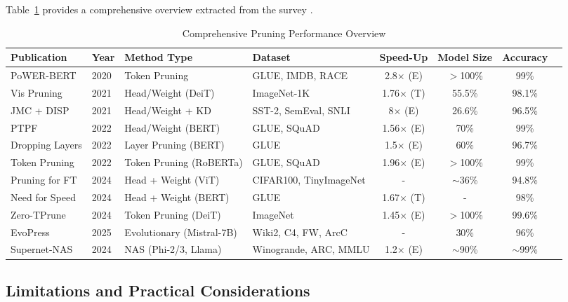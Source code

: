 Table~\ref{tab:comprehensive_pruning} provides a comprehensive overview extracted from the survey \cite{fernando2025}.

\begin{table}[H]
	\begin{adjustwidth}{-2cm}{0cm} 
		\centering
		\tiny
		\caption{Comprehensive Pruning Performance Overview}
		\label{tab:comprehensive_pruning}
		\begin{tabular}{@{}lllp{4.5cm}cccc@{}}
			\toprule
			\textbf{Publication} & \textbf{Year} & \textbf{Method Type} & \textbf{Dataset} & \textbf{Speed-Up} & \textbf{Model Size} & \textbf{Accuracy} \\ \midrule
			PoWER-BERT & 2020 & Token Pruning & GLUE, IMDB, RACE & 2.8$\times$ (E) & $>$100\% & 99\% \\
			Vis Pruning & 2021 & Head/Weight (DeiT) & ImageNet-1K & 1.76$\times$ (T) & 55.5\% & 98.1\% \\
			JMC + DISP & 2021 & Head/Weight + KD & SST-2, SemEval, SNLI & 8$\times$ (E) & 26.6\% & 96.5\% \\
			PTPF & 2022 & Head/Weight (BERT) & GLUE, SQuAD & 1.56$\times$ (E) & 70\% & 99\% \\
			Dropping Layers & 2022 & Layer Pruning (BERT) & GLUE & 1.5$\times$ (E) & 60\% & 96.7\% \\
			Token Pruning & 2022 & Token Pruning (RoBERTa) & GLUE, SQuAD & 1.96$\times$ (E) & $>$100\% & 99\% \\
			Pruning for FT & 2024 & Head + Weight (ViT) & CIFAR100, TinyImageNet & - & $\sim$36\% & 94.8\% \\
			Need for Speed & 2024 & Head + Weight (BERT) & GLUE & 1.67$\times$ (T) & - & 98\% \\
			Zero-TPrune & 2024 & Token Pruning (DeiT) & ImageNet & 1.45$\times$ (E) & $>$100\% & 99.6\% \\
			EvoPress & 2025 & Evolutionary (Mistral-7B) & Wiki2, C4, FW, ArcC & - & 30\% & 96\% \\
			Supernet-NAS & 2024 & NAS (Phi-2/3, Llama) & Winogrande, ARC, MMLU & 1.2$\times$ (E) & $\sim$90\% & $\sim$99\% \\
			\bottomrule
		\end{tabular}
	\end{adjustwidth}
\end{table}

\subsection{Limitations and Practical Considerations}

